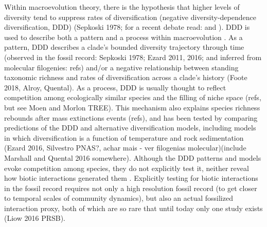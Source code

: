 \documentclass[a4paper]{article}
\begin{document}
Within macroevolution theory, there is the hypothesis that higher levels of diversity tend to suppress rates of diversification (negative diversity-dependence diversification, DDD) (Sepkoski 1978; for a recent debate read: \citealt{harmon2015unbounded} and \citealt{rabosky2015limits}). 
DDD is used to describe both a pattern and a process within macroevolution \citep{rabosky2013diversity}. 
As a pattern, DDD describes a clade's bounded diversity trajectory through time (observed in the fossil record: Sepkoski 1978; Ezard 2011, 2016; and inferred from molecular filogenies: refs) and/or a negative relationship between standing taxonomic richness and rates of diversification across a clade's history (Foote 2018, Alroy, Quental).
As a process, DDD is usually thought to reflect competition among ecologically similar species and the filling of niche space (refs, but see Moen and Morlon TREE). This mechanism also explains species richness rebounds after mass extinctions events (refs), and has been tested by comparing predictions of the DDD and alternative diversification models, including models in which diversification is a function of temperature and rock sedimentation (Ezard 2016, Silvestro PNAS?, achar mais - ver filogenias molecular)(include Marshall and Quental 2016 somewhere).
Although the DDD patterns and models evoke competition among species, they do not explicitly test it, neither reveal how biotic interactions generated them \citep{jablonski2008biotic}. 
Explicitly testing for biotic interactions in the fossil record requires not only a high resolution fossil record (to get closer to temporal scales of community dynamics), but also an actual fossilized interaction proxy, both of which are so rare that until today only one study exists (Liow 2016 PRSB).
\end{document}

